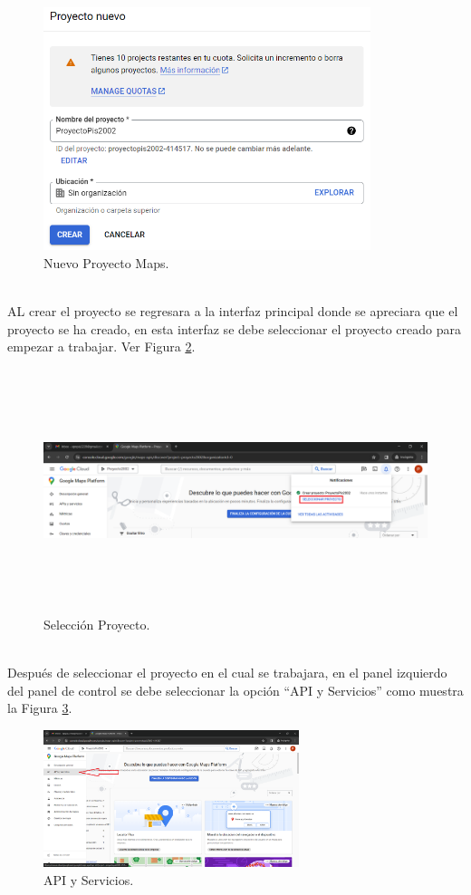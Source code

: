 \documentclass[a4paper,10pt, oneside, titlepage]{article}
\begin{document}
	\begin{figure}[!h]
		\centering
		\includegraphics[width = 1\linewidth, height = 7.1cm]{Nuevo_Proyecto_Maps.png}
		\caption{Nuevo Proyecto Maps.}
		\label{Nuevo_Proyecto_Maps}
	\end{figure} \\
	\indent AL crear el proyecto se regresara a la interfaz principal donde se apreciara que el proyecto se ha creado, en esta interfaz se debe seleccionar el proyecto creado para empezar a trabajar. Ver Figura \ref{Seleccion_SDK_Proyecto}.
	\begin{figure}[!h]
		\centering
		\includegraphics[width = 1\linewidth, height = 7.1cm]{Seleccion_SDK_Proyecto.png}
		\caption{Selección Proyecto.}
		\label{Seleccion_SDK_Proyecto}
	\end{figure} \\
	\indent Después de seleccionar el proyecto en el cual se trabajara, en el panel izquierdo del panel de control se debe seleccionar la opción ``API y Servicios'' como muestra la Figura \ref{API_Servicios_SDK_Maps}.
	\begin{figure}[!h]
		\centering
		\includegraphics[width = 1\linewidth, height = 4cm]{API_Servicios_SDK_Maps.png}
		\caption{API y Servicios.}
		\label{API_Servicios_SDK_Maps}
	\end{figure} \\
\end{document}

